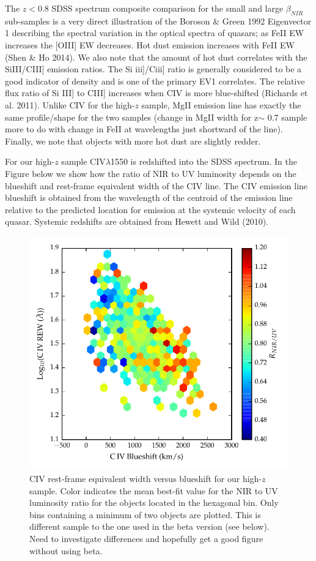 The $z < 0.8$ SDSS spectrum composite comparison for the small and large $\beta_{NIR}$ sub-samples is a very direct illustration of the Boroson \& Green 1992 Eigenvector 1 describing the spectral variation in the optical spectra of quasars; as FeII EW increases the [OIII] EW decreases. 
Hot dust emission increases with FeII EW (Shen \& Ho 2014). 
We also note that the amount of hot dust correlates with the SiIII/CIII] emission ratios. 
The Si iii]/Ciii] ratio is generally considered to be a good indicator of density and is one of the primary EV1 correlates. 
The relative flux ratio of Si III] to CIII] increases when CIV is more blue-shifted (Richards et al. 2011). 
Unlike CIV for the high-$z$ sample, MgII emission line has exactly the same profile/shape for the two samples (change in MgII width for z$\sim$ 0.7 sample more to do with change in FeII at wavelengths just shortward of the line). 
Finally, we note that objects with more hot dust are slightly redder.

For our high-$z$ sample CIV$\lambda$1550 is redshifted into the SDSS spectrum. 
In the Figure below we show how the ratio of NIR to UV luminosity depends on the blueshift and rest-frame equivalent width of the CIV line. 
The CIV emission line blueshift is obtained from the wavelength of the centroid of the emission line relative to the predicted location for emission at the systemic velocity of each quasar. 
Systemic redshifts are obtained from Hewett and Wild (2010).

\begin{figure}
\centering
  \includegraphics[width=\columnwidth]{figures/chapter06/hot_dust_ratio.pdf}
\caption{CIV rest-frame equivalent width versus blueshift for our high-$z$ sample. Color indicates the mean best-fit value for the NIR to UV luminosity ratio for the objects located in the hexagonal bin. Only bins containing a minimum of two objects are plotted. This is different sample to the one used in the beta version (see below). Need to investigate differences and hopefully get a good figure without using beta.}
  \label{fig:}
\end{figure}

